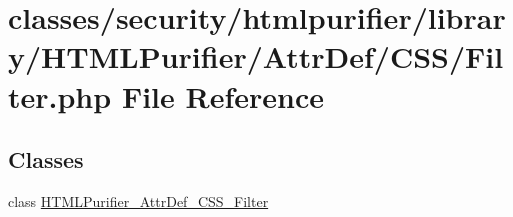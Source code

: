 \hypertarget{AttrDef_2CSS_2Filter_8php}{\section{classes/security/htmlpurifier/library/\+H\+T\+M\+L\+Purifier/\+Attr\+Def/\+C\+S\+S/\+Filter.php File Reference}
\label{AttrDef_2CSS_2Filter_8php}
}
\subsection*{Classes}
\begin{DoxyCompactItemize}
\item 
class \hyperlink{classHTMLPurifier__AttrDef__CSS__Filter}{H\+T\+M\+L\+Purifier\+\_\+\+Attr\+Def\+\_\+\+C\+S\+S\+\_\+\+Filter}
\end{DoxyCompactItemize}
